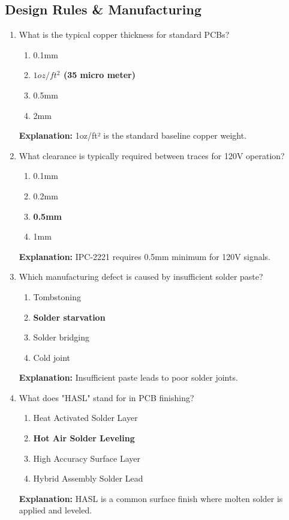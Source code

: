 \documentclass{article}
\begin{document}
	\subsection*{Design Rules \& Manufacturing}
	
	\begin{enumerate}[resume]
		\item What is the typical copper thickness for standard PCBs?
		\begin{enumerate}
			\item 0.1mm
			\item \textbf{$1oz/ft^2$ (35  micro meter)}
			\item 0.5mm
			\item 2mm
		\end{enumerate}
		\textbf{Explanation:} 1oz/ft² is the standard baseline copper weight.
		
		\item What clearance is typically required between traces for 120V operation?
		\begin{enumerate}
			\item 0.1mm
			\item 0.2mm
			\item \textbf{0.5mm}
			\item 1mm
		\end{enumerate}
		\textbf{Explanation:} IPC-2221 requires 0.5mm minimum for 120V signals.
		
		\item Which manufacturing defect is caused by insufficient solder paste?
		\begin{enumerate}
			\item Tombstoning
			\item \textbf{Solder starvation}
			\item Solder bridging
			\item Cold joint
		\end{enumerate}
		\textbf{Explanation:} Insufficient paste leads to poor solder joints.
		
		\item What does "HASL" stand for in PCB finishing?
		\begin{enumerate}
			\item Heat Activated Solder Layer
			\item \textbf{Hot Air Solder Leveling}
			\item High Accuracy Surface Layer
			\item Hybrid Assembly Solder Lead
		\end{enumerate}
		\textbf{Explanation:} HASL is a common surface finish where molten solder is applied and leveled.
		

\end{enumerate}
\end{document}
